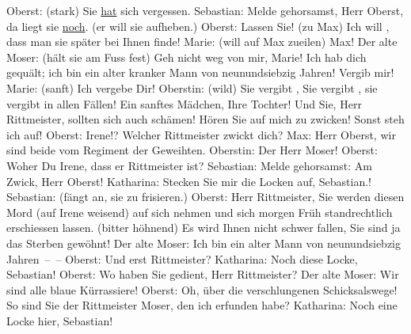 \begin{ledgroupsized}[t]{13cm}
           Oberst: (stark) Sie \uline{hat} sich vergessen.\pend
           \pstart
           Sebastian: Melde gehorsamst, Herr Oberst, da liegt sie \uline{noch}. (er will sie aufheben.)\pend
           \pstart
           Oberst: Lassen Sie! (zu Max) Ich will , dass
					man sie später bei Ihnen finde!\pend
           \pstart
           Marie: (will auf Max zueilen) Max!\pend
           \pstart
           Der alte Moser: (hält sie am Fuss fest) Geh nicht weg von mir, Marie! Ich hab
					dich gequält; ich bin ein alter kranker Mann von neunundsiebzig Jahren! Vergib
					mir!\pend
           \pstart
           Marie: (sanft) Ich vergebe Dir!\pend
           \pstart
           Oberstin: (wild) Sie vergibt , Sie vergibt , sie vergibt in allen Fällen! Ein sanftes
					Mädchen, Ihre Tochter! Und Sie, Herr Rittmeister, sollten sich auch schämen!
					Hören Sie auf mich zu zwicken! Sonst steh ich auf!\pend
           \pstart
           Oberst: Irene!? Welcher Rittmeister zwickt dich?\pend
           \pstart
           Max: Herr Oberst, wir sind beide vom Regiment der Geweihten.\pend
           \pstart
           Oberstin: Der Herr Moser!\pend
           \pstart
           Oberst: Woher \label{T_L01900_1v}\label{T_L01900_1h} Du Irene, dass er Rittmeister
					ist?\pend
           \pstart
           Sebastian: Melde gehorsamst: Am Zwick, Herr Oberst!\pend
           \pstart
           Katharina: Stecken Sie mir die Locken auf, Sebastian.!\pend
           \pstart
           Sebastian: (fängt an, sie zu frisieren.)\pend
           \pstart
           Oberst: Herr Rittmeister, Sie werden diesen Mord (auf Irene weisend) auf sich
					nehmen und sich morgen Früh standrechtlich erschiessen lassen. (bitter höhnend)
					Es wird Ihnen nicht schwer fallen, Sie sind ja das Sterben gewöhnt!\pend
           \pstart
           Der alte Moser: Ich bin ein alter Mann von neunundsiebzig Jahren – –\pend
           \pstart
           {\pb}Oberst: Und erst
					Rittmeister?\pend
           \pstart
           Katharina: Noch diese Locke, Sebastian!\pend
           \pstart
           Oberst: Wo haben Sie gedient, Herr Rittmeister?\pend
           \pstart
           Der alte Moser: Wir sind alle blaue Kürrassiere!\pend
           \pstart
           Oberst: Oh, über die verschlungenen Schicksalswege! So sind Sie der Rittmeister
					Moser, den ich erfunden habe?\pend
           \pstart
           Katharina: Noch eine Locke hier, Sebastian!\pend

\end{ledgroupsized}

